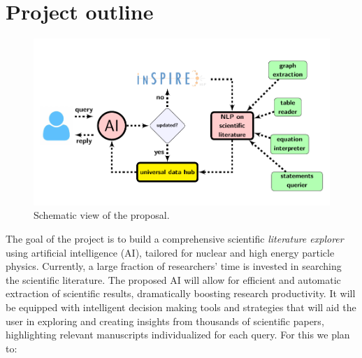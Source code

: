 \documentclass{article}[12pt,preprint]
\begin{document}
\section{Project outline}
\begin{figure}[!h]
\centering
\includegraphics[width=1\textwidth, angle=0]{gallery/ai}  
\caption{Schematic view of the proposal.}
\label{f.1}
\end{figure}

The goal of the project is to build a comprehensive scientific
{\it literature explorer} using artificial intelligence (AI),
tailored for nuclear and high energy particle physics.
%
Currently, a large fraction of researchers' time is invested in 
searching the scientific literature.  The proposed AI will allow
for efficient and automatic extraction of scientific results,
dramatically boosting research productivity.
%
It will be equipped with intelligent decision making tools and 
strategies that will aid the user in exploring and creating insights 
from thousands of scientific papers, highlighting relevant manuscripts 
individualized for each query.
%
For this we plan to:
\end{document}

